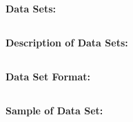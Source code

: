 \documentclass[11pt, oneside]{article}
\begin{document}
\paragraph
{\bfseries Data Sets:}

\subsection{}
\paragraph
{\bfseries Description of Data Sets:}

\subsection{}
\paragraph
{\bfseries Data Set Format:}

\subsection{}
\paragraph
{\bfseries Sample of Data Set:}
\end{document}
